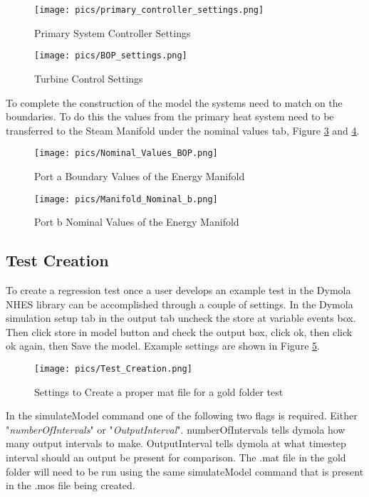 \begin{figure}[hbtp]
\centering
\texttt{[image: pics/primary\_controller\_settings.png]}
\caption{Primary System Controller Settings}
\label{primary controller settings}
\end{figure}


\begin{figure}[hbtp]
\centering
\texttt{[image: pics/BOP\_settings.png]}
\caption{Turbine Control Settings}
\label{Turbine Control Settings}
\end{figure}

To complete the construction of the model the systems need to match on the boundaries.  To do this the values from the primary heat system need to be transferred to the Steam Manifold under the nominal values tab, Figure \ref{Port a Nominal Values} and \ref{port B Nominal Values}.

\begin{figure}[hbtp]
\centering
\texttt{[image: pics/Nominal\_Values\_BOP.png]}
\caption{Port a Boundary Values of the Energy Manifold}
\label{Port a Nominal Values}
\end{figure}

\begin{figure}[hbtp]
\centering
\texttt{[image: pics/Manifold\_Nominal\_b.png]}
\caption{Port b Nominal Values of the Energy Manifold }
\label{port B Nominal Values}
\end{figure}

\subsection{Test Creation}
To create a regression test once a user develops an example test in the Dymola NHES library can be accomplished through a couple of settings. In the Dymola simulation setup tab in the output tab uncheck the store at variable events box. Then click store in model button and check the output box, click ok, then click ok again, then Save the model. Example settings are shown in Figure \ref{mat file settings}.




\begin{figure}[hbtp]
\centering
\texttt{[image: pics/Test\_Creation.png]}
\caption{Settings to Create a proper mat file for a gold folder test}
\label{mat file settings}
\end{figure}
In the simulateModel command one of the following two flags is required. Either "\textit{numberOfIntervals}" or "\textit{OutputInterval}". numberOfIntervals tells dymola how many output intervals to make. OutputInterval tells dymola at what timestep interval should an output be present for comparison. The .mat file in the gold folder will need to be run using the same simulateModel command that is present in the .mos file being created.

